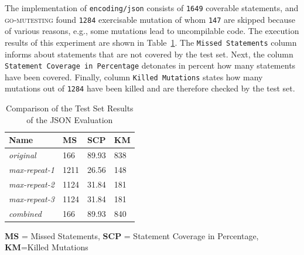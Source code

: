 The implementation of \texttt{encoding/json} consists of \texttt{1649} coverable statements, and \textsc{go-mutesting} found \texttt{1284} exercisable mutation of whom \texttt{147} are skipped because of various reasons, e.g., some mutations lead to uncompilable code. The execution results of this experiment are shown in Table~\ref{table:evaluationJSONResults}. The \texttt{Missed Statements} column informs about statements that are not covered by the test set. Next, the column \texttt{Statement Coverage in Percentage} detonates in percent how many statements have been covered. Finally, column \texttt{Killed Mutations} states how many mutations out of \texttt{1284} have been killed and are therefore checked by the test set.

\begin{table}
\caption{Comparison of the Test Set Results of the JSON Evaluation}
\label{table:evaluationJSONResults}
\center
\begin{threeparttable}
\begin{tabular}{| l | l | l | l |}
\hline \textbf{Name} & \textbf{MS} & \textbf{SCP} & \textbf{KM} \tabularnewline
\hline \emph{original} & 166 & 89.93 & 838 \tabularnewline
\hline \emph{max-repeat-1} & 1211 & 26.56 & 148 \tabularnewline
\hline \emph{max-repeat-2} & 1124 & 31.84 & 181 \tabularnewline
\hline \emph{max-repeat-3} & 1124 & 31.84 & 181 \tabularnewline
\hline \emph{combined} & 166 & 89.93 & 840 \tabularnewline
\hline
\end{tabular}
\begin{tablenotes}
\textbf{MS} = Missed Statements, \textbf{SCP} = Statement Coverage in Percentage, \textbf{KM}=Killed Mutations
\end{tablenotes}
\end{threeparttable}
\end{table}

